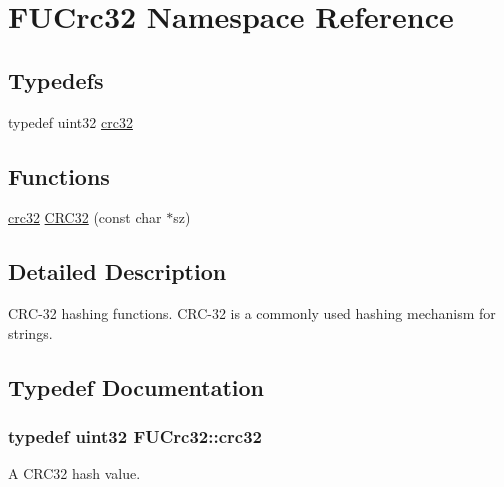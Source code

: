 \hypertarget{namespaceFUCrc32}{
\section{FUCrc32 Namespace Reference}
\label{namespaceFUCrc32}
}
\subsection*{Typedefs}
\begin{DoxyCompactItemize}
\item 
typedef uint32 \hyperlink{namespaceFUCrc32_ab4fb49f3af91a54e778b1999313ff8b5}{crc32}
\end{DoxyCompactItemize}
\subsection*{Functions}
\begin{DoxyCompactItemize}
\item 
\hyperlink{namespaceFUCrc32_ab4fb49f3af91a54e778b1999313ff8b5}{crc32} \hyperlink{namespaceFUCrc32_ac53035441db1b39fa510cfa20ce6f9af}{CRC32} (const char $\ast$sz)
\end{DoxyCompactItemize}


\subsection{Detailed Description}
CRC-\/32 hashing functions. CRC-\/32 is a commonly used hashing mechanism for strings. 

\subsection{Typedef Documentation}
\hypertarget{namespaceFUCrc32_ab4fb49f3af91a54e778b1999313ff8b5}{
\subsubsection[{crc32}]{\setlength{\rightskip}{0pt plus 5cm}typedef uint32 {\bf FUCrc32::crc32}}}
\label{namespaceFUCrc32_ab4fb49f3af91a54e778b1999313ff8b5}
A CRC32 hash value. 

